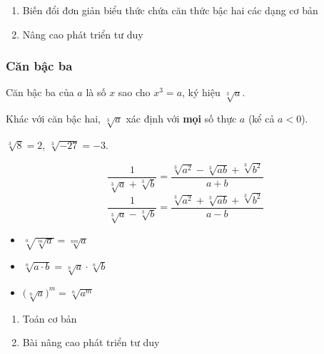 \documentclass[12pt,a4paper]{article}
\begin{document}
\begin{enumerate}[label=\textbf{Dạng \arabic*:}, leftmargin=*, align=left]
  \item Biến đổi đơn giản biểu thức chứa căn thức bậc hai các dạng cơ bản
  \item Nâng cao phát triển tư duy
\end{enumerate}

\subsubsection{Căn bậc ba}

\begin{dinhnghia}
  Căn bậc ba của $a$ là số $x$ sao cho $x^3 = a$, ký hiệu $\sqrt[3]{a}$.

  Khác với căn bậc hai, $\sqrt[3]{a}$ xác định với \textbf{mọi} số thực $a$ (kể cả $a < 0$).
\end{dinhnghia}

\begin{vidu}
  $\sqrt[3]{8} = 2$, \quad $\sqrt[3]{-27} = -3$.
\end{vidu}

\begin{congthuc}[title={Trục căn thức ở mẫu với căn bậc ba}]
  \[\frac{1}{\sqrt[3]{a} + \sqrt[3]{b}} = \frac{\sqrt[3]{a^2} - \sqrt[3]{ab} + \sqrt[3]{b^2}}{a + b}\]
  \[\frac{1}{\sqrt[3]{a} - \sqrt[3]{b}} = \frac{\sqrt[3]{a^2} + \sqrt[3]{ab} + \sqrt[3]{b^2}}{a - b}\]
\end{congthuc}

\begin{tinhchat}[title={Căn bậc $n$ \normalfont\textit{(Mở rộng)}}]
  \begin{itemize}
    \item $\sqrt[n]{\sqrt[m]{a}} = \sqrt[nm]{a}$
    \item $\sqrt[n]{a \cdot b} = \sqrt[n]{a} \cdot \sqrt[n]{b}$
    \item $\bigl(\sqrt[n]{a}\bigr)^m = \sqrt[n]{a^m}$
  \end{itemize}
\end{tinhchat}

\begin{enumerate}[label=\textbf{Dạng \arabic*:}, leftmargin=*, align=left]
  \item Toán cơ bản
  \item Bài nâng cao phát triển tư duy
\end{enumerate}

\end{document}
